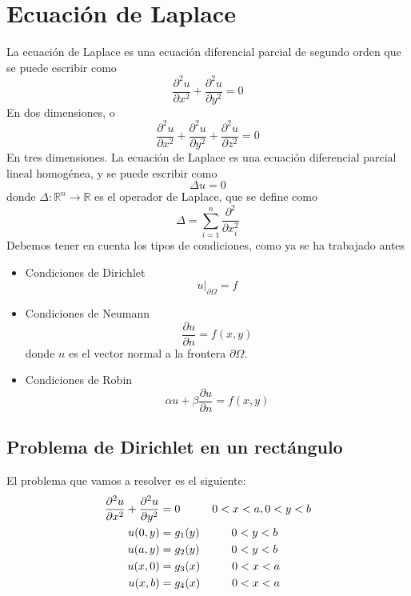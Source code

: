 \documentclass[11pt]{book}
\theoremstyle{plain}
\theoremstyle{definition}
\newcommand{\R}{\mathbb{R}}
\begin{document}
\chapter{Ecuación de Laplace}
\minitoc
    La ecuación de Laplace es una ecuación diferencial parcial de segundo orden que se puede escribir como
    \[
        \frac{\partial^{2}u}{\partial x^{2}} + \frac{\partial^{2}u}{\partial y^{2}} = 0
    \]
    En dos dimensiones, o
    \[
        \frac{\partial^{2}u}{\partial x^{2}} + \frac{\partial^{2}u}{\partial y^{2}} + \frac{\partial^{2}u}{\partial z^{2}} = 0
    \]
    En tres dimensiones. La ecuación de Laplace es una ecuación diferencial parcial lineal homogénea, y se puede escribir como
    \[
        \Delta u = 0
    \]
    donde $\Delta: \R^{n} \to \R$ es el operador de Laplace, que se define como
    \[
        \Delta = \sum_{i=1}^{n} \frac{\partial^{2}}{\partial x_{i}^{2}}
    \]
    Debemos tener en cuenta los tipos de condiciones, como ya se ha trabajado antes
    \begin{itemize}
        \item Condiciones de Dirichlet
        \[
            u|_{\partial \Omega}= f
        \]
        \item Condiciones de Neumann
        \[
            \frac{\partial u}{\partial n} = f(x,y)
        \]
        donde $n$ es el vector normal a la frontera $\partial \Omega$.
        \item Condiciones de Robin
        \[
            \alpha u + \beta \frac{\partial u}{\partial n} = f(x,y)
        \]
    \end{itemize}
    \section{Problema de Dirichlet en un rectángulo}
    El problema que vamos a resolver es el siguiente:
    \setcounter{equation}{0}
    \begin{align}
        \frac{\partial^{2}u}{\partial x^{2}} + \frac{\partial^{2}u}{\partial y^{2}} &= 0 \hspace{10mm} 0<x<a, 0<y<b\\
        u(0,y) &= g_{1}(y) \hspace{10mm} 0<y<b\\
        u(a,y) &= g_{2}(y) \hspace{10mm} 0<y<b\\
        u(x,0) &= g_{3}(x) \hspace{10mm} 0<x<a\\
        u(x,b) &= g_{4}(x) \hspace{10mm} 0<x<a
    \end{align}
\end{document}
